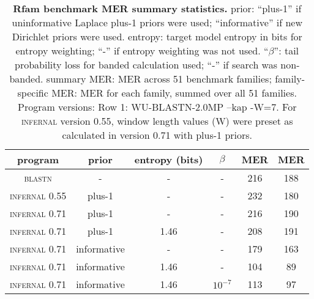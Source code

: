 \begin{table}[htb]
\begin{center}
\begin{tabular}{cccccc}
\multicolumn{1}{c}{program} &
\multicolumn{1}{c}{prior} & \multicolumn{1}{c}{entropy (bits)} &
\multicolumn{1}{c}{$\beta$} & \multicolumn{1}{c}{MER} &
\multicolumn{1}{c}{MER} \\ \hline
\textsc{blastn}         & -           & -    & -       & 216 & 188 \\
\textsc{infernal} 0.55  & plus-1      & -    & -       & 232 & 180 \\
\textsc{infernal} 0.71  & plus-1      & -    & -       & 216 & 190 \\
\textsc{infernal} 0.71  & plus-1      & 1.46 & -       & 208 & 191 \\
\textsc{infernal} 0.71  & informative & -    & -       & 179 & 163 \\
\textsc{infernal} 0.71  & informative & 1.46 & -       & 104 &  89 \\
\textsc{infernal} 0.71  & informative & 1.46 & $10^{-7}$ & 113 &  97 \\ 
\end{tabular}
\end{center}
\caption{\textbf{Rfam benchmark MER summary statistics.} 
    prior: ``plus-1'' if uninformative Laplace plus-1 priors were
    used; ``informative'' if new Dirichlet priors were used.
    entropy: target model entropy in bits for entropy weighting; ``-''
    if entropy weighting was not used.
    ``$\beta$'': tail probability loss for banded calculation used; ``-'' if search
    was non-banded. summary MER: MER across 51 benchmark
    families; family-specific MER: MER for each family, summed
    over all 51 families. Program versions: Row 1: WU-BLASTN-2.0MP
    --kap -W=7. For \textsc{infernal} version 0.55, window length values (W)
    were preset as calculated in version 0.71 with plus-1 priors.}
\label{tbl:rmarkmerlist}
\end{table}

